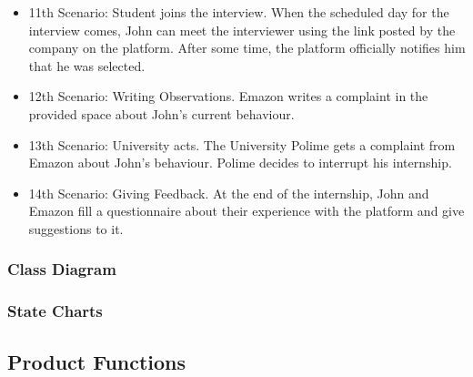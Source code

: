 \documentclass{article}
\begin{document}
\begin{itemize}
        \item 11th Scenario: Student joins the interview. When the scheduled day for the interview comes, John can meet the interviewer using the link posted by the company on the platform. After some time, the platform officially notifies him that he was selected.
        \item 12th Scenario: Writing Observations. Emazon writes a complaint in the provided space about John's current behaviour.
        \item 13th Scenario: University acts. The University Polime gets a complaint from Emazon about John's behaviour. Polime decides to interrupt his internship.
        \item 14th Scenario: Giving Feedback. At the end of the internship, John and Emazon fill a questionnaire about their experience with the platform and give suggestions to it.
    \end{itemize}
\subsubsection{Class Diagram}
\subsubsection{State Charts}
\subsection{Product Functions}
\end{document}
